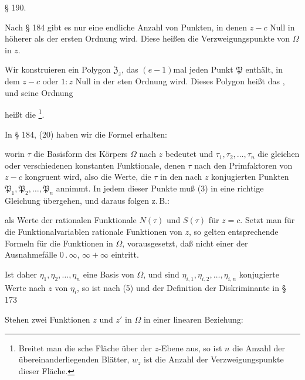 \begin{center}
§ 190. 
\end{center}

Nach § 184 gibt es nur eine endliche Anzahl von Punkten, in denen $z-c$ Null in höherer als der ersten Ordnung wird. Diese heißen die Verzweigungspunkte von $\Omega$ in $z$.

Wir konstruieren ein Polygon $\mathfrak{Z}_z$, das $(e-1)$mal jeden Punkt $\mathfrak{P}$ enthält, in dem $z-c$ oder $1:z$ Null in der $e$ten Ordnung wird. Dieses Polygon heißt das , und seine Ordnung


heißt die \footnote{Breitet man die sche Fläche über der $z$-Ebene aus, so ist $n$ die Anzahl der übereinanderliegenden Blätter, $w_z$ ist die Anzahl der Verzweigungspunkte dieser Fläche.}.

In § 184, (20) haben wir die Formel erhalten:


worin $\tau$ die Basisform des Körpers $\Omega$ nach $z$ bedeutet und $\tau_1, \tau_2, \ldots, \tau_n$ die gleichen oder verschiedenen konstanten Funktionale, denen $\tau$ nach den Primfaktoren von $z-c$ kongruent wird, also die Werte, die $\tau$ in den nach $z$ konjugierten Punkten $\mathfrak{P}_1, \mathfrak{P}_2, \ldots, \mathfrak{P}_n$ annimmt. In jedem dieser Punkte muß (3) in eine richtige Gleichung übergehen, und daraus folgen z.\,B.:



als Werte der rationalen Funktionale $N(\tau)$ und $S(\tau)$ für $z=c$. Setzt man für die Funktionalvariablen rationale Funktionen von $z$, so gelten entsprechende Formeln für die Funktionen in $\Omega$, vorausgesetzt, daß nicht einer der Ausnahmefälle $0\,.\,\infty$, $\infty+\infty$ eintritt.

Ist daher $\eta_1, \eta_2, \ldots, \eta_n$ eine Basis von $\Omega$, und sind $\eta_{i,1}, \eta_{i,2}, \ldots, \eta_{i,n}$ konjugierte Werte nach $z$ von $\eta_i$, so ist nach (5) und der Definition der Diskriminante in § 173


Stehen zwei Funktionen $z$ und $z'$ in $\Omega$ in einer linearen Beziehung:

